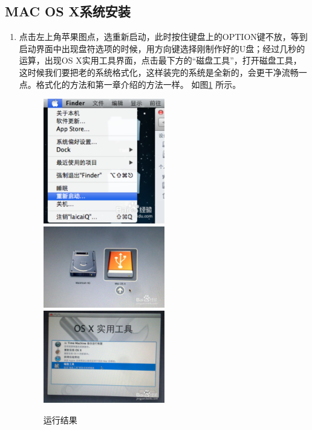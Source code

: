 \documentclass{article}
\begin{document}
\subsection{MAC OS X系统安装}
\begin{enumerate}
\item 点击左上角苹果图点，选重新启动，此时按住键盘上的OPTION键不放，等到启动界面中出现盘符选项的时候，用方向键选择刚制作好的U盘；经过几秒的运算，出现OS X实用工具界面，点击最下方的“磁盘工具”，打开磁盘工具，这时候我们要把老的系统格式化，这样装完的系统是全新的，会更干净流畅一点。格式化的方法和第一章介绍的方法一样。
如图\ref{tu21} 所示。
\begin{figure}[!htb] %
\centering
\includegraphics[width=0.5\textwidth]{figures/tu21.png}
\includegraphics[width=0.5\textwidth]{figures/tu22.png}
\includegraphics[width=0.5\textwidth]{figures/tu23.png}
\caption{\small 运行结果}
\label{tu21}
\end{figure} 

\end{enumerate}
\end{document}
